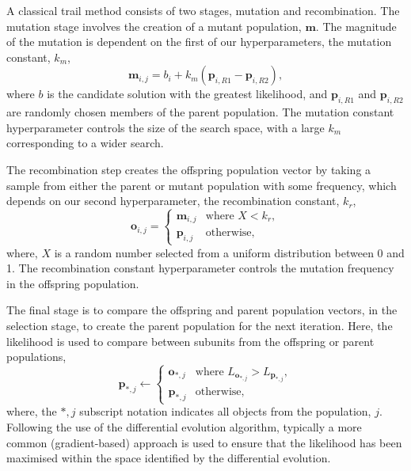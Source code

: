 \documentclass[
 reprint,
 superscriptaddress,
 amsmath,amssymb,
 aps,
]{revtex4-1}
\begin{document}
A classical trail method consists of two stages, mutation and recombination. 
The mutation stage involves the creation of a mutant population, $\mathbf{m}$. 
The magnitude of the mutation is dependent on the first of our hyperparameters, the mutation constant, $k_m$, 
%
\begin{equation}
    \mathbf{m}_{i,j} = b_i + k_m (\mathbf{p}_{i, R1} - \mathbf{p}_{i, R2}),
\end{equation}
%
where $b$ is the candidate solution with the greatest likelihood, and $\mathbf{p}_{i, R1}$ and $\mathbf{p}_{i, R2}$ are randomly chosen members of the parent population. 
The mutation constant hyperparameter controls the size of the search space, with a large $k_m$ corresponding to a wider search. 

The recombination step creates the offspring population vector by taking a sample from either the parent or mutant population with some frequency, which depends on our second hyperparameter, the recombination constant, $k_r$,
%
\begin{equation}
    \mathbf{o}_{i, j} = 
    \begin{cases}
        \mathbf{m}_{i, j} & \text{where } X < k_r,\\
        \mathbf{p}_{i, j} & \text{otherwise},
    \end{cases}
\end{equation}
%
where, $X$ is a random number selected from a uniform distribution between 0 and 1. 
The recombination constant hyperparameter controls the mutation frequency in the offspring population. 

The final stage is to compare the offspring and parent population vectors, in the selection stage, to create the parent population for the next iteration. 
Here, the likelihood is used to compare between subunits from the offspring or parent populations, 
%
\begin{equation}
    \mathbf{p}_{*, j} \leftarrow 
    \begin{cases}
        \mathbf{o}_{*, j} & \text{where } L_{\mathbf{o}_{*, j}} > L_{\mathbf{p}_{*, j}},\\
        \mathbf{p}_{*, j} & \text{otherwise},
    \end{cases}
\end{equation}
%
where, the $*, j$ subscript notation indicates all objects from the population, $j$.
Following the use of the differential evolution algorithm, typically a more common (gradient-based) approach is used to ensure that the likelihood has been maximised within the space identified by the differential evolution.
\end{document}
